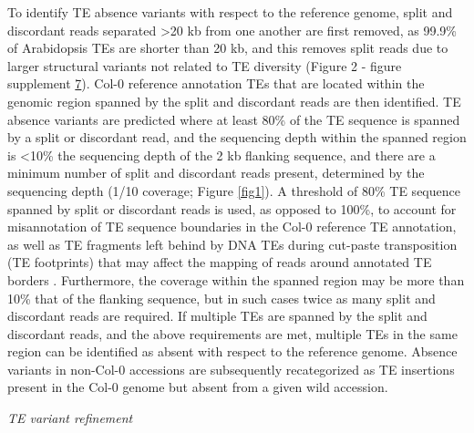\documentclass[12pt]{article}
\begin{document}
To identify TE absence variants with respect to the reference genome,
split and discordant reads separated \textgreater{}20 kb from one
another are first removed, as 99.9\% of Arabidopsis TEs are shorter
than 20 kb, and this removes split reads due to larger structural
variants not related to TE diversity (Figure 2 - figure supplement
\hyperref[fig2s7]{7}). Col-0 reference annotation TEs that are located
within the genomic region spanned by the split and discordant reads
are then identified. TE absence variants are predicted where at least
80\% of the TE sequence is spanned by a split or discordant read, and
the sequencing depth within the spanned region is \textless{}10\% the
sequencing depth of the 2 kb flanking sequence, and there are a
minimum number of split and discordant reads present, determined by
the sequencing depth (1/10 coverage; Figure \ref{fig1}). A threshold
of 80\% TE sequence spanned by split or discordant reads is used, as
opposed to 100\%, to account for misannotation of TE sequence
boundaries in the Col-0 reference TE annotation, as well as TE
fragments left behind by DNA TEs during cut-paste transposition (TE
footprints) that may affect the mapping of reads around annotated TE
borders \cite{Plasterk:1991vd}. Furthermore, the coverage within the
spanned region may be more than 10\% that of the flanking sequence,
but in such cases twice as many split and discordant reads are
required. If multiple TEs are spanned by the split and discordant
reads, and the above requirements are met, multiple TEs in the same
region can be identified as absent with respect to the reference
genome. Absence variants in non-Col-0 accessions are subsequently
recategorized as TE insertions present in the Col-0 genome but absent
from a given wild accession.

\emph{TE variant refinement}
\end{document}
